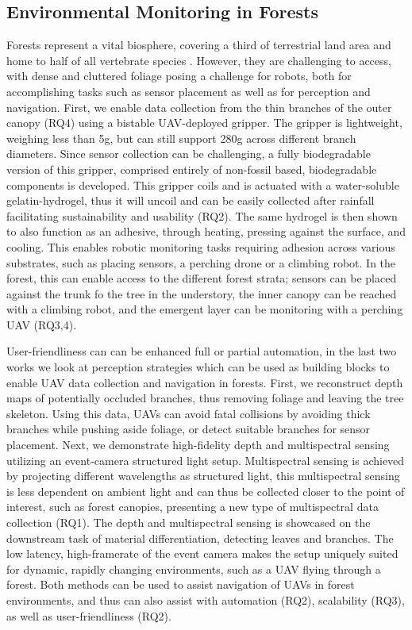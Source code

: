 \subsection{Environmental Monitoring in Forests}
Forests represent a vital biosphere, covering a third of terrestrial land area \cite{FAO2020a} and home to half of all vertebrate species \cite{Pillay2022}.
However, they are challenging to access, with dense and cluttered foliage posing a challenge for robots, both for accomplishing tasks such as sensor placement as well as for perception and navigation. First, we enable data collection from the thin branches of the outer canopy (RQ4) using a bistable UAV-deployed gripper. The gripper is lightweight, weighing less than 5g, but can still support 280g across different branch diameters. Since sensor collection can be challenging, a fully biodegradable version of this gripper, comprised entirely of non-fossil based, biodegradable components is developed. This gripper coils and is actuated with a water-soluble gelatin-hydrogel, thus it will uncoil and can be easily collected after rainfall facilitating sustainability and usability (RQ2). The same hydrogel is then shown to also function as an adhesive, through heating, pressing against the surface, and cooling. This enables robotic monitoring tasks requiring adhesion across various substrates, such as placing sensors, a perching drone or a climbing robot. In the forest, this can enable access to the different forest strata; sensors can be placed against the trunk fo the tree in the understory, the inner canopy can be reached with a climbing robot, and the emergent layer can be monitoring with a perching UAV (RQ3,4).

User-friendliness can can be enhanced full or partial automation, in the last two works we look at perception strategies which can be used as building blocks to enable UAV data collection and navigation in forests. First, we reconstruct depth maps of potentially occluded branches, thus removing foliage and leaving the tree skeleton. Using this data, UAVs can avoid fatal collisions by avoiding thick branches while pushing aside foliage, or detect suitable branches for sensor placement. Next, we demonstrate high-fidelity depth and multispectral sensing utilizing an event-camera structured light setup. Multispectral sensing is achieved by projecting different wavelengths as structured light, this multispectral sensing is less dependent on ambient light and can thus be collected closer to the point of interest, such as forest canopies, presenting a new type of multispectral data collection (RQ1). The depth and multispectral sensing is showcased on the downstream task of material differentiation, detecting leaves and branches. The low latency, high-framerate of the event camera makes the setup uniquely suited for dynamic, rapidly changing environments, such as a UAV flying through a forest. Both methods can be used to assist navigation of UAVs in forest environments, and thus can also assist with automation (RQ2), scalability (RQ3), as well as user-friendliness (RQ2).

